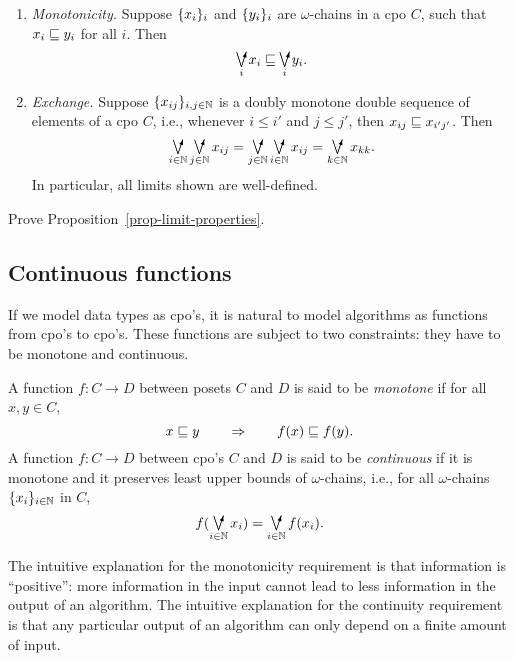 \documentclass{article}
\begin{document}
\begin{proposition}\label{prop-limit-properties}
  \begin{enumerate}
  \item {\em Monotonicity.}  Suppose $\{x_i\}_i$ and $\{y_i\}_i$ are
    $\omega$-chains in a cpo $C$, such that $x_i\sqsubseteq y_i$ for all
    $i$. Then
    \[ \dirsup_i x_i \sqleq\dirsup_i y_i.
    \]
  \item {\em Exchange.} Suppose $\{x_{ij}\}_{i,j\in\mathbb{N}}$ is a doubly
    monotone double sequence of elements of a cpo $C$, i.e., whenever
    $i\leq i'$ and $j\leq j'$, then $x_{ij}\sqsubseteq x_{i'j'}$. Then
    \[ \dirsup_{i\in\N}\dirsup_{j\in\N} x_{ij} = 
    \dirsup_{j\in\N}\dirsup_{i\in\N} x_{ij} =
    \dirsup_{k\in\N} x_{kk}.
    \]
    In particular, all limits shown are well-defined.
  \end{enumerate}
\end{proposition}

\begin{exercise}
  Prove Proposition~\ref{prop-limit-properties}.
\end{exercise}

\subsection{Continuous functions}

If we model data types as cpo's, it is natural to model algorithms as
functions from cpo's to cpo's. These functions are subject to two
constraints: they have to be monotone and continuous.

\begin{definition}
  A function $f:C\to D$ between posets $C$ and $D$ is said to be {\em
    monotone} if for all $x,y\in C$, 
  \[ x\sqsubseteq y \hspace{2em}\Rightarrow\hspace{2em} f(x)\sqsubseteq f(y).
  \]
  A function $f:C\to D$ between cpo's $C$ and $D$ is said to be {\em
    continuous} if it is monotone and it preserves least upper bounds
  of $\omega$-chains, i.e., for all $\omega$-chains $\{x_i\}_{i\in\mathbb{N}}$
  in $C$,
  \[ f(\dirsup_{i\in\N}x_i) = \dirsup_{i\in\N}f(x_i).
  \]
\end{definition}

The intuitive explanation for the monotonicity requirement is that
information is ``positive'': more information in the input cannot lead
to less information in the output of an algorithm. The intuitive
explanation for the continuity requirement is that any particular
output of an algorithm can only depend on a finite amount of input.
\end{document}
